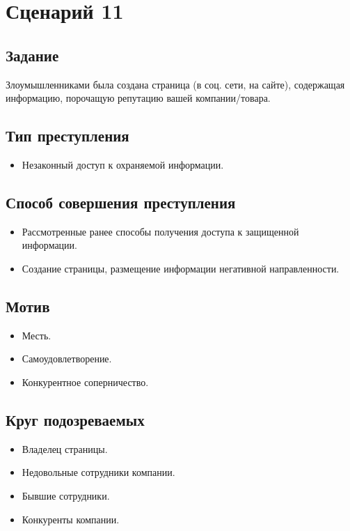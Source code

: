 \section*{Сценарий 11}

\subsection*{Задание}
Злоумышленниками была создана страница (в соц. сети, на сайте), содержащая
информацию, порочащую репутацию вашей компании/товара.

\subsection*{Тип преступления}
\begin{itemize}
  \item Незаконный доступ к охраняемой информации.
\end{itemize}

\subsection*{Способ совершения преступления}
\begin{itemize}
  \item Рассмотренные ранее способы получения доступа к защищенной информации.
  \item Создание страницы, размещение информации негативной направленности.
\end{itemize}

\subsection*{Мотив}
\begin{itemize}
  \item Месть.
  \item Самоудовлетворение.
  \item Конкурентное соперничество.
\end{itemize}

\subsection*{Круг подозреваемых}
\begin{itemize}
  \item Владелец страницы.
  \item Недовольные сотрудники компании.
  \item Бывшие сотрудники.
  \item Конкуренты компании.
\end{itemize}

